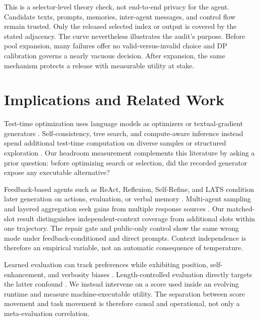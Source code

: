 \documentclass{article}
\begin{document}
This is a selector-level theory check, not end-to-end privacy for the agent. Candidate texts, prompts, memories, inter-agent messages, and control flow remain trusted. Only the released selected index or output is covered by the stated adjacency. The curve nevertheless illustrates the audit's purpose. Before pool expansion, many failures offer no valid-versus-invalid choice and DP calibration governs a nearly vacuous decision. After expansion, the same mechanism protects a release with measurable utility at stake.

\section{Implications and Related Work}

Test-time optimization uses language models as optimizers or textual-gradient generators \citep{yang2023opro,yuksekgonul2024textgrad}. Self-consistency, tree search, and compute-aware inference instead spend additional test-time computation on diverse samples or structured exploration \citep{wang2022selfconsistency,yao2023tot,zhou2023lats,snell2024testtime}. Our headroom measurement complements this literature by asking a prior question: before optimizing search or selection, did the recorded generator expose any executable alternative?

Feedback-based agents such as ReAct, Reflexion, Self-Refine, and LATS condition later generation on actions, evaluation, or verbal memory \citep{yao2022react,shinn2023reflexion,madaan2023selfrefine,zhou2023lats}. Multi-agent sampling and layered aggregation seek gains from multiple response sources \citep{li2024moreagents,wang2024moa,xu2026tacomas}. Our matched-slot result distinguishes independent-context coverage from additional slots within one trajectory. The repair gate and public-only control show the same wrong mode under feedback-conditioned and direct prompts. Context independence is therefore an empirical variable, not an automatic consequence of temperature.

Learned evaluation can track preferences while exhibiting position, self-enhancement, and verbosity biases \citep{zheng2023judge}. Length-controlled evaluation directly targets the latter confound \citep{dubois2024length}. We instead intervene on a score used inside an evolving runtime and measure machine-executable utility. The separation between score movement and task movement is therefore causal and operational, not only a meta-evaluation correlation.
\end{document}
